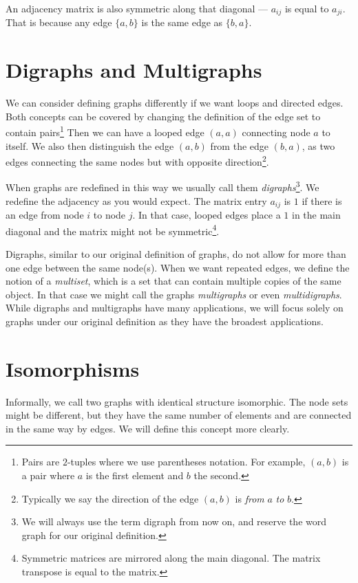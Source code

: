 \documentclass{iansnotes}
\begin{document}
  An adjacency matrix is also symmetric along that diagonal --- $a_{ij}$ is equal to $a_{ji}$.
  That is because any edge $\{ a, b \}$ is the same edge as $\{ b, a \}$.

\section{Digraphs and Multigraphs}
  We can consider defining graphs differently if we want loops and directed edges.
  Both concepts can be covered by changing the definition of the edge set to contain pairs\footnote{Pairs are $2$-tuples where we use parentheses notation. For example, $(a,b)$ is a pair where $a$ is the first element and $b$ the second.}
  Then we can have a looped edge $(a,a)$ connecting node $a$ to itself.
  We also then distinguish the edge $(a,b)$ from the edge $(b,a)$, as two edges connecting the same nodes but with opposite direction\footnote{Typically we say the direction of the edge $(a,b)$ is \emph{from} $a$ \emph{to} $b$.}.

  When graphs are redefined in this way we usually call them \emph{digraphs}\footnote{We will always use the term digraph from now on, and reserve the word graph for our original definition.}.
  We redefine the adjacency as you would expect.
  The matrix entry $a_{ij}$ is $1$ if there is an edge from node $i$ to node $j$.
  In that case, looped edges place a $1$ in the main diagonal and the matrix might not be symmetric\footnote{Symmetric matrices are mirrored along the main diagonal. The matrix transpose is equal to the matrix.}.

  Digraphs, similar to our original definition of graphs, do not allow for more than one edge between the same node(s).
  When we want repeated edges, we define the notion of a \emph{multiset}, which is a set that can contain multiple copies of the same object.
  In that case we might call the graphs \emph{multigraphs} or even \emph{multidigraphs}.
  While digraphs and multigraphs have many applications, we will focus solely on graphs under our original definition as they have the broadest applications.

\section{Isomorphisms}
  Informally, we call two graphs with identical structure isomorphic.
  The node sets might be different, but they have the same number of elements and are connected in the same way by edges.
  We will define this concept more clearly.
\end{document}
